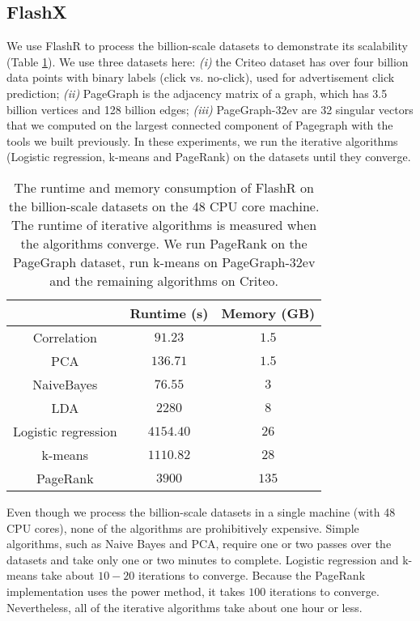 \documentclass[simplex.tex]{subfiles}
\begin{document}
\subsection{FlashX}

We use FlashR to process the billion-scale datasets to demonstrate its
scalability (Table \ref{tbl:scale}). We use three datasets here: \textit{(i)}
the Criteo dataset has over four billion data points with binary labels
(click vs. no-click), used for advertisement click prediction;
\textit{(ii)} PageGraph is the adjacency matrix of a graph, which has 3.5
billion vertices and 128 billion edges;
\textit{(iii)} PageGraph-32ev are 32 singular vectors that we computed on
the largest connected component of Pagegraph with the tools we built previously.
In these experiments, we run the iterative algorithms
(Logistic regression, k-means and PageRank) on the datasets until they converge.

\begin{table}[h!]
\begin{center}
\caption{The runtime and memory consumption of FlashR on the billion-scale
		datasets on the 48 CPU core machine. The runtime of iterative
		algorithms is measured when the algorithms converge. We run PageRank
		on the PageGraph dataset, run k-means on PageGraph-32ev and the remaining
		algorithms on Criteo.}
\vspace{-10pt}
\footnotesize
\begin{tabular}{|c|c|c|}
\hline
& Runtime (s) & Memory (GB) \\
\hline
Correlation & $91.23$ & $1.5$ \\
\hline
PCA & $136.71$ & $1.5$ \\
\hline
NaiveBayes & $76.55$ & $3$ \\
\hline
LDA & $2280$ & $8$ \\
\hline
Logistic regression & $4154.40$ & $26$ \\
\hline
k-means & $1110.82$ & $28$ \\
\hline
PageRank & $3900$ & $135$ \\
\hline
\end{tabular}
\normalsize
\label{tbl:scale}
\end{center}
\vspace{-10pt}
\end{table}

Even though we process the billion-scale datasets in a single machine (with
48 CPU cores), none of
the algorithms are prohibitively expensive. Simple algorithms, such as
Naive Bayes and PCA, require one or two passes over the datasets and take
only one or two minutes to complete. Logistic regression and k-means take
about $10-20$ iterations to converge. Because the PageRank implementation
uses the power method, it takes $100$ iterations to converge.
Nevertheless, all of the iterative algorithms take about one hour or less.
\end{document}
